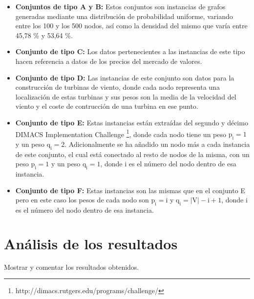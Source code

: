 \begin{itemize}
	
	\item \textbf{Conjuntos de tipo A y B:} Estos conjuntos son instancias de grafos generadas mediante una distribución de probabilidad uniforme, variando entre los 100 y los 500 nodos, así como la densidad del mismo que varía entre 45,78 \% y 53,64 \%.
	\item  \textbf{Conjunto de tipo C:} Los datos pertenecientes a las instancias de este tipo hacen referencia a datos de los precios del mercado de valores.
	\item  \textbf{Conjunto de tipo D:} Las instancias de este conjunto son datos para la construcción de turbinas de viento, donde cada nodo representa una localización de estas turbinas y sus pesos son la media de la velocidad del viento y el coste de contrucción de una turbina en ese punto.
	\item  \textbf{Conjunto de tipo E:} Estas instancias están extraídas del segundo y décimo DIMACS Implementation Challenge \footnote{http://dimacs.rutgers.edu/programs/challenge/}, donde cada nodo tiene un peso $\mathrm{p_{i} = 1}$ y un peso $\mathrm{q_{i} = 2}$. Adicionalmente se ha añadido un nodo más a cada instancia de este conjunto, el cual está conectado al resto de nodos de la misma, con un peso $\mathrm{p_{i} = 1}$ y un peso $\mathrm{q_{i} = 1}$, donde i es el número del nodo dentro de esa instancia.
	\item  \textbf{Conjunto de tipo F:} Estas instancias son las mismas que en el conjunto E pero en este caso los pesos de cada nodo son $\mathrm{p_{i} = i}$ y $\mathrm{q_{i} = |V| - i + 1}$, donde i es el número del nodo dentro de esa instancia.
	
	
\end{itemize}


\section{Análisis de los resultados}
Mostrar y comentar los resultados obtenidos.

